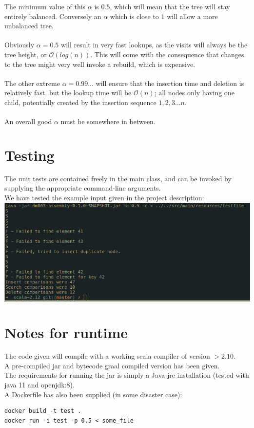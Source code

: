 \documentclass[oneside]{scrbook}
\begin{document}
The minimum value of this $\alpha$ is $0.5$, which will mean that the tree will stay entirely balanced.
Conversely an $\alpha$ which is close to $1$ will allow a more unbalanced tree.
\\\\
Obviously $\alpha = 0.5$ will result in very fast lookups, as the visits will always be the tree height, or $\mathcal{O}(log(n))$.
This will come with the consequence that changes to the tree might very well invoke a rebuild, which is expensive.
\\\\
The other extreme $\alpha = 0.99...$ will ensure that the insertion time and deletion is relatively fast, but the lookup time will be $\mathcal{O}(n)$;
all nodes only having one child, potentially created by the insertion sequence $1,2,3... n$.
\\\\
An overall good $\alpha$ must be somewhere in between.

\section*{Testing}
The unit tests are contained freely in the main class, and can be invoked by supplying the appropriate command-line arguments.\\
We have tested the example input given in the project description:\\
\includegraphics[scale=0.5]{kimtest.png}

\section*{Notes for runtime}
The code given will compile with a working scala compiler of version $> 2.10$.\\
A pre-compiled jar and bytecode graal compiled version has been given.\\
The requirements for running the jar is simply a Java-jre installation (tested with java 11 and openjdk:8).\\
A Dockerfile has also been supplied (in some disaster case):
\begin{lstlisting}
docker build -t test .
docker run -i test -p 0.5 < some_file
\end{lstlisting}
\end{document}
